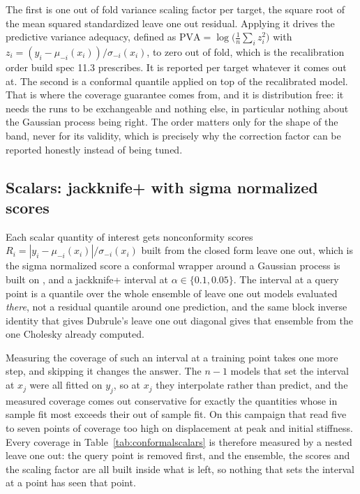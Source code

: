 \documentclass[11pt,a4paper]{article}
\begin{document}
The first is one out of fold variance scaling factor per target, the square root of the mean
squared standardized leave one out residual. Applying it drives the predictive variance
adequacy, defined as $\mathrm{PVA} = \log\!\big(\tfrac{1}{n}\sum_i z_i^2\big)$ with
$z_i = (y_i - \mu_{-i}(x_i))/\sigma_{-i}(x_i)$, to zero out of fold, which is the recalibration
order build spec 11.3 prescribes. It is reported per target whatever it comes out at. The
second is a conformal quantile applied on top of the recalibrated model. That is where the
coverage guarantee comes from, and it is distribution free: it needs the runs to be
exchangeable and nothing else, in particular nothing about the Gaussian process being right.
The order matters only for the shape of the band, never for its validity, which is precisely
why the correction factor can be reported honestly instead of being tuned.

\subsection{Scalars: jackknife+ with sigma normalized scores}
Each scalar quantity of interest gets nonconformity scores
$R_i = |y_i - \mu_{-i}(x_i)| / \sigma_{-i}(x_i)$ built from the closed form leave one out, which
is the sigma normalized score a conformal wrapper around a Gaussian process is built on
\cite{jaber2025}, and a jackknife+ interval \cite{barber2021} at $\alpha \in \{0.1, 0.05\}$. The interval at a query point is a quantile
over the whole ensemble of leave one out models evaluated \emph{there}, not a residual quantile
around one prediction, and the same block inverse identity that gives Dubrule's leave one out
diagonal gives that ensemble from the one Cholesky already computed.

Measuring the coverage of such an interval at a training point takes one more step, and
skipping it changes the answer. The $n-1$ models that set the interval at $x_j$ were all fitted
on $y_j$, so at $x_j$ they interpolate rather than predict, and the measured coverage comes out
conservative for exactly the quantities whose in sample fit most exceeds their out of sample
fit. On this campaign that read five to seven points of coverage too high on displacement at
peak and initial stiffness. Every coverage in Table~\ref{tab:conformalscalars} is therefore
measured by a nested leave one out: the query point is removed first, and the ensemble, the
scores and the scaling factor are all built inside what is left, so nothing that sets the
interval at a point has seen that point.
\end{document}
